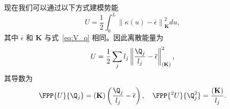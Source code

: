 现在我们可以通过以下方式建模势能
\begin{equation}
  U=\frac{1}{2}\int_0^L \left\| \kappa(u) - \overline{\epsilon}\right\|_{\mathbf{K}}^2 du,
\end{equation}
其中 $\overline{\epsilon}$ 和 $\mathbf{K}$ 与式~\ref{eq:V_q} 相同。因此离散能量为
\begin{equation}
  U= \frac{1}{2}\sum_j l_j \left\| \frac{\Q_j}{l_j} - \overline{\epsilon}\right\|_{\left(\mathbf{K}\right)}^2,
\end{equation}
其导数为
\begin{equation}
    \FPP{U}{\Q_j} = \left(\mathbf{K}\right) \left( \frac{\Q_j}{l_j} - \overline{\epsilon}\right),\quad
    \FPP{^2U}{\Q_j^2} = \frac{\left(\mathbf{K}\right)}{l_j} .
\end{equation}


\iffalse
